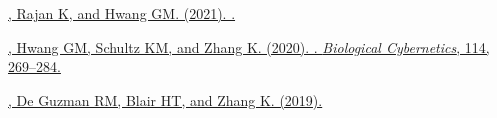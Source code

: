 
\begin{description}
  \item \href{https://arxiv.org/abs/2105.07284}
    {, Rajan K, and Hwang GM. (2021). .
    }
  \item \href{https://dx.doi.org/10.1007/s00422-020-00823-z}
    {, Hwang GM, Schultz KM, and Zhang K. (2020).
    . \emph{Biological Cybernetics}, 114,
    269--284. }
  \item \href{https://dx.doi.org/10.1371/journal.pcbi.1006741}
    {, De Guzman RM, Blair HT, and Zhang K. (2019).
}
\end{description}
